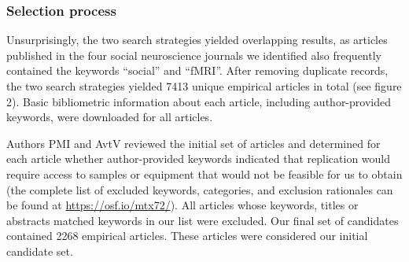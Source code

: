 \documentclass[
  man,floatsintext]{apa6}
\begin{document}
\hypertarget{selection-process}{%
\subsubsection{Selection process}\label{selection-process}}

Unsurprisingly, the two search strategies yielded overlapping results, as articles published in the four social neuroscience journals we identified also frequently contained the keywords ``social'' and ``fMRI''. After removing duplicate records, the two search strategies yielded 7413 unique empirical articles in total (see figure 2). Basic bibliometric information about each article, including author-provided keywords, were downloaded for all articles.

Authors PMI and AvtV reviewed the initial set of articles and determined for each article whether author-provided keywords indicated that replication would require access to samples or equipment that would not be feasible for us to obtain (the complete list of excluded keywords, categories, and exclusion rationales can be found at \url{https://osf.io/mtx72/}). All articles whose keywords, titles or abstracts matched keywords in our list were excluded. Our final set of candidates contained 2268 empirical articles. These articles were considered our initial candidate set.
\end{document}
